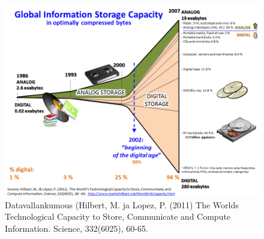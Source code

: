 \documentclass[
]{book}
\begin{document}
\begin{figure}

{\centering \includegraphics[width=1\linewidth]{images/datarevolution} 

}

\caption{Datavallankumous (Hilbert, M. ja Lopez, P. (2011) The Worlds Technological Capacity to Store, Communicate and Compute Information. Science, 332(6025), 60-65.}\label{fig:datarevolution}
\end{figure}
\end{document}
